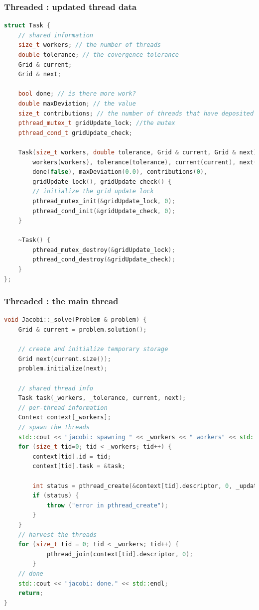 \begin{frame}[fragile]
% 
  \frametitle{Threaded : updated thread data}
%
  \begin{lstlisting}[language=c++,name=Jacobi:updated-threaded,basicstyle=\tt\bfseries\tiny]
struct Task {
    // shared information 
    size_t workers; // the number of threads
    double tolerance; // the covergence tolerance
    Grid & current;
    Grid & next;

    bool done; // is there more work?
    double maxDeviation; // the value
    size_t contributions; // the number of threads that have deposited contributions
    pthread_mutex_t gridUpdate_lock; //the mutex
    pthread_cond_t gridUpdate_check;

    Task(size_t workers, double tolerance, Grid & current, Grid & next) :
        workers(workers), tolerance(tolerance), current(current), next(next),
        done(false), maxDeviation(0.0), contributions(0),
        gridUpdate_lock(), gridUpdate_check() {
        // initialize the grid update lock
        pthread_mutex_init(&gridUpdate_lock, 0);
        pthread_cond_init(&gridUpdate_check, 0);
    }

    ~Task() {
        pthread_mutex_destroy(&gridUpdate_lock);
        pthread_cond_destroy(&gridUpdate_check);
    }
};

  \end{lstlisting}
%
\end{frame}

\begin{frame}[fragile]
% 
  \frametitle{Threaded : the main thread}
%
  \begin{lstlisting}[language=c++,name=Jacobi:updated-solve,basicstyle=\tt\bfseries\tiny]
void Jacobi::_solve(Problem & problem) {
    Grid & current = problem.solution();

    // create and initialize temporary storage
    Grid next(current.size());
    problem.initialize(next);

    // shared thread info
    Task task(_workers, _tolerance, current, next);
    // per-thread information
    Context context[_workers];
    // spawn the threads
    std::cout << "jacobi: spawning " << _workers << " workers" << std::endl;
    for (size_t tid=0; tid < _workers; tid++) {
        context[tid].id = tid;
        context[tid].task = &task;
        
        int status = pthread_create(&context[tid].descriptor, 0, _update, &context[tid]);
        if (status) {
            throw ("error in pthread_create");
        }
    }
    // harvest the threads
    for (size_t tid = 0; tid < _workers; tid++) {
            pthread_join(context[tid].descriptor, 0);
        }
    // done
    std::cout << "jacobi: done." << std::endl;
    return;
}
  \end{lstlisting}
%
\end{frame}

